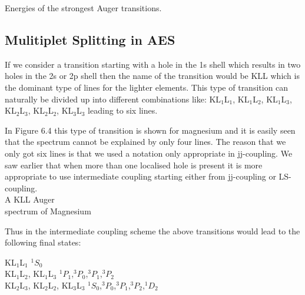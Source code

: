          \newpage
          \vspace*{14cm}

            Energies  of  the  strongest
          Auger transitions.


\subsection{Mulitiplet Splitting in AES}
If we consider a transition starting with  a hole in the 1s shell which results in two holes in the 2s or 2p shell then the name of the transition would be KLL which is the dominant type of lines for the lighter elements. This type of transition can naturally be divided up into different combinations like: KL$_1$L$_1$, KL$_1$L$_2$, KL$_1$L$_3$, KL$_2$L$_3$, KL$_2$L$_2$, KL$_3$L$_3$ leading to six lines.

In Figure 6.4 this type of transition is shown for magnesium and it is easily seen that the spectrum cannot be explained by only four lines. The reason that we only got six lines is that we used a notation  only appropriate in jj-coupling. We saw earlier that when more than one localised hole is present it is more appropriate to use intermediate coupling starting either from jj-coupling or LS-coupling.\\

         A KLL Auger\\ spectrum of Magnesium\\

             \vspace*{9cm}

Thus in the intermediate coupling scheme the above transitions would lead to the following final states:

             \vspace{0.5cm}

          \noindent     KL$_1$L$_1$      \hfill      $^1S_0$\\
          KL$_1$L$_2$,           KL$_1$L$_3$            \hfill
          $^1P_1$,$^3P_0$,$^3P_1$,$^3P_2$\\
          KL$_2$L$_3$, KL$_2$L$_2$,  KL$_3$L$_3$   \hfill
          $^1S_0$,$^3P_0$,$^3P_1$,$^3P_2$,$^1D_2$\\

          \vspace{0.5cm}

